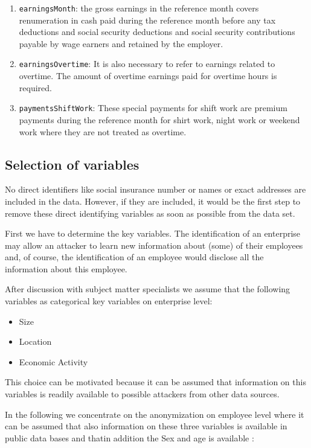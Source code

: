 \documentclass[12pt]{scrartcl}\usepackage[]{graphicx}\usepackage[]{color}
\begin{document}
\begin{enumerate}
\item \texttt{earningsMonth}: the gross earnings in the reference month covers renumeration in cash paid during the reference month before any tax deductions and social security deductions and social security contributions payable by wage earners and retained by the employer.
\item \texttt{earningsOvertime}: It is also necessary to refer to earnings related to overtime. The amount of overtime earnings paid for overtime hours is required.
\item \texttt{paymentsShiftWork}: These special payments for shift work are premium payments during the reference month for shirt work, night work or weekend work where they are not treated as overtime.
\end{enumerate}

\subsection{Selection of variables}
No direct identifiers like social insurance number or names or exact addresses are included in the data. However, if they are included, it would be the first step to remove these direct identifying variables as soon as possible from the data set.

First we have to determine the key variables. The identification of an enterprise may allow an attacker to learn new information about (some) of their employees and, of course, the identification of an employee would disclose all the information about this employee.

After discussion with subject matter specialists we assume that the following variables as categorical key variables on enterprise level:

\begin{itemize}
\item Size
\item Location
\item Economic Activity
\end{itemize}

This choice can be motivated because it can be assumed that information on this variables is readily available to possible attackers from other data sources.

In the following we concentrate on the anonymization on employee level where it can be assumed that also information on these three variables is available in public data bases and thatin addition the Sex and age is available \citep[see also][for a similar scenario]{ichim07}:
\end{document}

